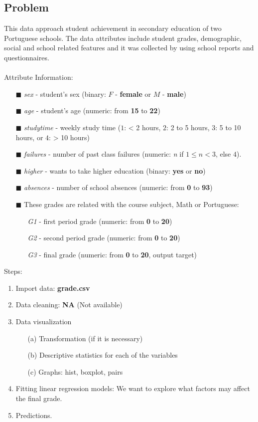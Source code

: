 \documentclass[a4paper]{article}
\begin{document}
\subsection{Problem}
\vspace{0.4cm}
This data approach student achievement in secondary education of two Portuguese schools. The data attributes include student grades, demographic, social and school related features and it was collected by using school reports and questionnaires. \\ \\
Attribute Information:
\begin{itemize}
    \item[$\blacksquare$] \textit{sex} - student’s sex (binary: $F$ - \textbf{female} or $M$ - \textbf{male})
    \item[$\blacksquare$] \textit{age} - student’s age (numeric: from \textbf{15} to \textbf{22})
    \item[$\blacksquare$] \textit{studytime} - weekly study time ($1$: \textless{} 2 hours, $2$: 2 to 5 hours, $3$: 5 to 10 hours, or $4$: \textgreater{} 10 hours)
    \item[$\blacksquare$] \textit{failures} - number of past class failures (numeric: \textit{n} if $1 \leq n < 3$, else $4$). 
    \item[$\blacksquare$] \textit{higher} - wants to take higher education (binary: \textbf{yes} or \textbf{no})
    \item[$\blacksquare$] \textit{absences} - number of school absences (numeric: from \textbf{0} to \textbf{93}) 
    \item[$\blacksquare$] These grades are related with the course subject, Math or Portuguese:
    \begin{itemize}
        \item[\textbullet] \textit{G1} - first period grade (numeric: from \textbf{0} to \textbf{20})
        \item[\textbullet] \textit{G2} - second period grade (numeric: from \textbf{0} to \textbf{20})
        \item[\textbullet] \textit{G3} - final grade (numeric: from \textbf{0} to \textbf{20}, output target) 
    \end{itemize}
\end{itemize} 
Steps:
\begin{enumerate}
    \item Import data: \textbf{grade.csv} 
    \item Data cleaning: \textbf{NA} (Not available)
    \item Data visualization 
    \begin{enumerate}
        \item[(a)] Transformation (if it is necessary)
        \item[(b)] Descriptive statistics for each of the variables
        \item[(c)] Graphs: hist, boxplot, pairs
    \end{enumerate}
    \item Fitting linear regression models: We want to explore what factors may affect the final grade.
    \item Predictions.
\end{enumerate}
\end{document}
